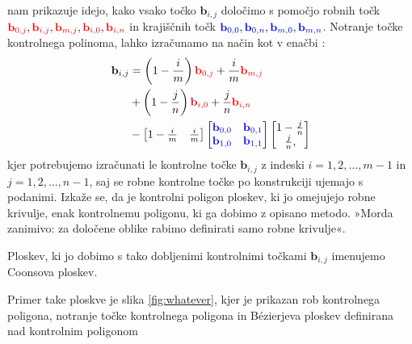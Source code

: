 \documentclass[a4paper,12pt]{article}
\begin{document}
nam prikazuje idejo, kako vsako točko $\mathbf{b}_{i,j}$ določimo s pomočjo 
robnih točk $\color{red} \mathbf{b}_{0,j} \color{black}, \color{red} \mathbf{b}_{i,j} \color{black}, \color{red} \mathbf{b}_{m,j} 
\color{black}, \color{red} \mathbf{b}_{i,0}\color{black} \color{black}, \color{red} \mathbf{b}_{i,n}$ in krajiščnih točk 
$\color{blue} \mathbf{b}_{0,0} \color{black}, \color{blue} \mathbf{b}_{0,n}\color{black}, \color{blue} \mathbf{b}_{m,0}\color{black}, \color{blue} \mathbf{b}_{m,n}$. 
 Notranje točke kontrolnega polinoma, lahko izračunamo na način kot v 
 enačbi : 
 \begin{align*}
   \mathbf{b}_{i,j} &= \left(1 - \frac{i}{m}\right) \color{red} \mathbf{b}_{0,j} \color{black}+\frac{i}{m}\color{red}\mathbf{b}_{m,j}\\
    &+ \left(1 - \frac{j}{n}\right)\color{red}\mathbf{b}_{i,0} \color{black}+\frac{j}{n} \color{red}\mathbf{b}_{i,n}\ \\
   &- 
   \begin{bmatrix} 
      1 - \frac{i}{m} & \frac{i}{m}
   \end{bmatrix}
   \begin{bmatrix} 
       \color{blue} \mathbf{b}_{0,0} &  \color{blue} \mathbf{b}_{0,1}\\
       \color{blue} \mathbf{b}_{1,0} &  \color{blue} \mathbf{b}_{1,1}
   \end{bmatrix}
   \begin{bmatrix}
      1 - \frac{j}{n}\\
      \frac{j}{n},
   \end{bmatrix}
\end{align*}
kjer potrebujemo izračunati le kontrolne točke 
$\mathbf{b}_{i,j}$ z indeski $i = 1,2,\dots,m-1$ in $j = 1,2,\dots,n-1$, 
saj se robne kontrolne točke po konstrukciji ujemajo s podanimi.
Izkaže se, da je kontrolni poligon ploskev, 
ki jo omejujejo robne krivulje, enak kontrolnemu poligonu, ki ga dobimo z opisano metodo. 
»Morda zanimivo: za določene oblike rabimo definirati samo robne krivulje«.

Ploskev, ki jo dobimo s tako dobljenimi kontrolnimi točkami $\mathbf{b}_{i,j}$
imenujemo Coonsova ploskev.

Primer take ploskve je slika \ref{fig:whatever}, kjer je prikazan 
rob kontrolnega poligona, notranje točke kontrolnega poligona in 
Bézierjeva ploskev definirana nad kontrolnim poligonom
\end{document}

